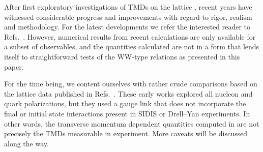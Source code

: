 \documentclass[a4paper,11pt]{article}
\newcommand{\Bernie}[1]{{\color[rgb]{0,0.5,0.75}#1}}
\begin{document}
After first exploratory investigations of TMDs on the lattice
\cite{Hagler:2009mb,Musch:2010ka}, recent years have witnessed considerable
progress and improvements with regard to rigor, realism and methodology.
\Bernie{For the latest developments we refer the
	interested reader to Refs.~\cite{Alexandrou:2017dzj,Ishikawa:2017faj,
	Engelhardt:2015xja,%
	Ji:2014hxa,%
	Musch:2011er,%
   Ji:2017oey,Yoon:2017qzo,Green:2017xeu,Zhang:2017bzy}.}
However, numerical results from recent calculations are only available
for a subset of observables, and the quantities calculated are not in a
form that lends itself to straightforward tests of the WW-type relations
as presented in this paper.
   



For the time being, we content ourselves with rather crude comparisons
based on the lattice data
published in Refs.~\cite{Hagler:2009mb,Musch:2010ka}.
These early works explored all nucleon and quark polarizations, but
they used a gauge link that does not incorporate the final or initial
state interactions present in SIDIS or Drell--Yan experiments. In other
words, the transverse momentum dependent quantities computed in
\cite{Hagler:2009mb,Musch:2010ka} are not precisely the TMDs measurable
in experiment. More caveats will be discussed along the way.
\end{document}
